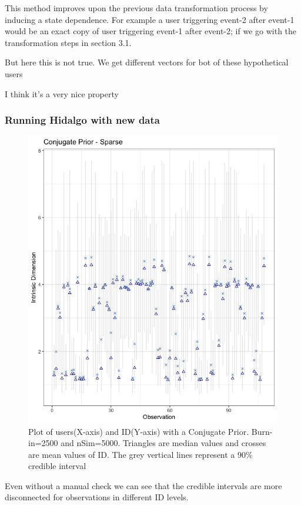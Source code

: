 \documentclass{article}
\begin{document}
This method improves upon the previous data transformation process by inducing a state dependence.
For example a user triggering event-2 after event-1 would be an exact copy of user triggering event-1 after event-2; if we go with the transformation steps in section 3.1.

But here this is not true. We get different vectors for bot of these hypothetical users

I think it's a very nice property

\subsubsection{Running Hidalgo with new data}
\begin{figure}[H]
  \includegraphics[width=1.3\textwidth]{SparseTransition-ConjugatePrior.png}
  \caption{Plot of users(X-axis) and ID(Y-axis) with a Conjugate Prior. Burn-in=2500 and nSim=5000. Triangles are median values and crosses are mean values of ID. The grey vertical lines represent a 90\% credible interval}
\label{fig}
\end{figure}

{Even without a manual check we can see that the credible intervals are more disconnected for observations in different ID levels}.
\end{document}

